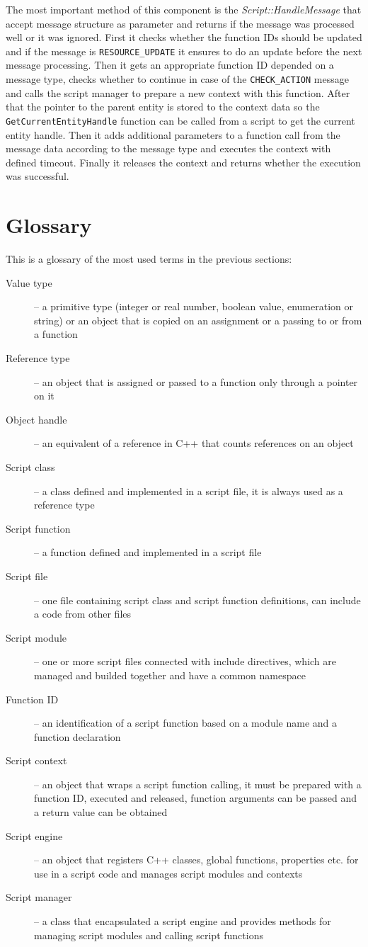 The most important method of this component is the \emph{Script::Handle\-Me\-ssa\-ge} that accept message structure as parameter and returns if the message was processed well or it was ignored. First it checks whether the function IDs should be updated and if the message is \verb/RESOURCE_UPDATE/ it ensures to do an update before the next message processing. Then it gets an appropriate function ID depended on a message type, checks whether to continue in case of the \verb/CHECK_ACTION/ message and calls the script manager to prepare a new context with this function. After that the pointer to the parent entity is stored to the context data so the \verb/GetCurrentEntityHandle/ function can be called from a script to get the current entity handle. Then it adds additional parameters to a function call from the message data according to the message type and executes the context with defined timeout. Finally it releases the context and returns whether the execution was successful.

\section{Glossary}

This is a glossary of the most used terms in the previous sections:

\begin{description}
  \item[Value type] -- a primitive type (integer or real number, boolean value, enumeration or string) or an object that is copied on an assignment or a passing to or from a function
  \item[Reference type] -- an object that is assigned or passed to a function only through a pointer on it
  \item[Object handle] -- an equivalent of a reference in C++ that counts references on an object
	\item[Script class] -- a class defined and implemented in a script file, it is always used as a reference type
	\item[Script function] -- a function defined and implemented in a script file
	\item[Script file] -- one file containing script class and script function definitions, can include a code from other files
	\item[Script module] -- one or more script files connected with include directives, which are managed and builded together and have a common namespace
	\item[Function ID] -- an identification of a script function based on a module name and a function declaration
	\item[Script context] -- an object that wraps a script function calling, it must be prepared with a function ID, executed and released, function arguments can be passed and a return value can be obtained
	\item[Script engine] -- an object that registers C++ classes, global functions, properties etc. for use in a script code and manages script modules and contexts
	\item[Script manager] -- a class that encapsulated a script engine and provides methods for managing script modules and calling script functions
\end{description}
